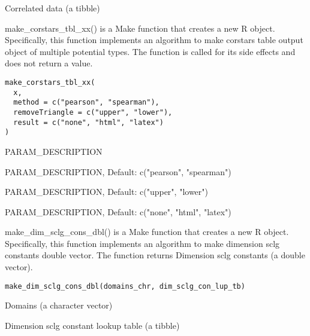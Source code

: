 \documentclass[a4paper]{book}
\begin{document}
%
\begin{Value}
Correlated data (a tibble)
\end{Value}
%
\begin{Description}\relax
make\_corstars\_tbl\_xx() is a Make function that creates a new R object. Specifically, this function implements an algorithm to make corstars table output object of multiple potential types. The function is called for its side effects and does not return a value.
\end{Description}
%
\begin{Usage}
\begin{verbatim}
make_corstars_tbl_xx(
  x,
  method = c("pearson", "spearman"),
  removeTriangle = c("upper", "lower"),
  result = c("none", "html", "latex")
)
\end{verbatim}
\end{Usage}
%
\begin{Arguments}
\begin{ldescription}
\item[\code{x}] PARAM\_DESCRIPTION

\item[\code{method}] PARAM\_DESCRIPTION, Default: c("pearson", "spearman")

\item[\code{removeTriangle}] PARAM\_DESCRIPTION, Default: c("upper", "lower")

\item[\code{result}] PARAM\_DESCRIPTION, Default: c("none", "html", "latex")
\end{ldescription}
\end{Arguments}
%
\begin{Description}\relax
make\_dim\_sclg\_cons\_dbl() is a Make function that creates a new R object. Specifically, this function implements an algorithm to make dimension sclg constants double vector. The function returns Dimension sclg constants (a double vector).
\end{Description}
%
\begin{Usage}
\begin{verbatim}
make_dim_sclg_cons_dbl(domains_chr, dim_sclg_con_lup_tb)
\end{verbatim}
\end{Usage}
%
\begin{Arguments}
\begin{ldescription}
\item[\code{domains\_chr}] Domains (a character vector)

\item[\code{dim\_sclg\_con\_lup\_tb}] Dimension sclg constant lookup table (a tibble)
\end{ldescription}
\end{Arguments}
\end{document}
